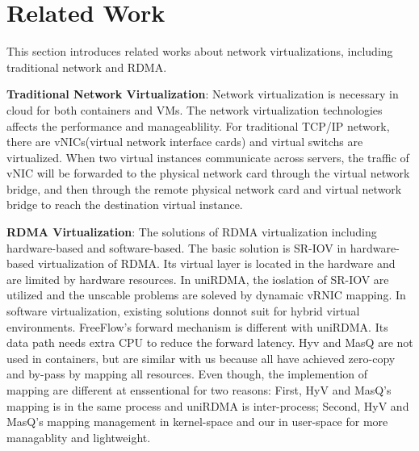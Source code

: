 \section{Related Work}
This section introduces related works about network virtualizations, including traditional network and RDMA.

\textbf{Traditional Network Virtualization}: Network virtualization is necessary in cloud for both containers and VMs. The network virtualization technologies affects the performance and manageablility. For traditional TCP/IP network, there are vNICs(virtual network interface cards) and virtual switchs are virtualized.  When two virtual instances communicate across servers, the traffic of vNIC will be forwarded to the physical network card through the virtual network bridge, and then through the remote physical network card and virtual network bridge to reach the destination virtual instance.

\textbf{RDMA Virtualization}: The solutions of RDMA virtualization including hardware-based and software-based. The basic solution is SR-IOV in hardware-based virtualization of RDMA. Its virtual layer is located in the hardware and are limited by hardware resources. In uniRDMA, the ioslation of SR-IOV are utilized and the unscable problems are soleved by dynamaic vRNIC mapping. In software virtualization, existing solutions donnot suit for hybrid virtual environments. FreeFlow's forward mechanism is different with uniRDMA. Its data path needs extra CPU to reduce the forward latency. Hyv and MasQ are not used in containers, but are similar with us because all have achieved zero-copy and by-pass by mapping all resources. Even though, the implemention of mapping are different at enssentional for two reasons: First, HyV and MasQ's mapping is in the same process and uniRDMA is inter-process; Second, HyV and MasQ's mapping management in kernel-space and our in user-space for more managablity and lightweight.

